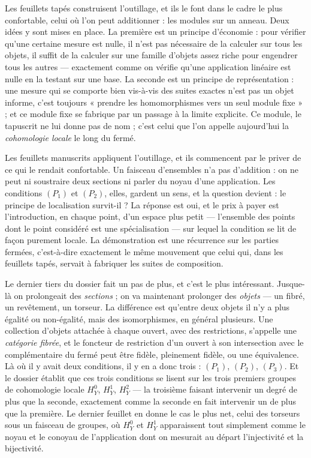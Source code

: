 \documentclass[11pt,a4paper]{article}
\begin{document}
\begin{resume}
Les feuillets tapés construisent l'outillage, et ils le font dans le cadre le
plus confortable, celui où l'on peut additionner : les modules sur un anneau.
Deux idées y sont mises en place. La première est un principe d'économie : pour
vérifier qu'une certaine mesure est nulle, il n'est pas nécessaire de la
calculer sur tous les objets, il suffit de la calculer sur une famille
d'objets assez riche pour engendrer tous les autres — exactement comme on
vérifie qu'une application linéaire est nulle en la testant sur une base. La
seconde est un principe de représentation : une mesure qui se comporte bien
vis-à-vis des suites exactes n'est pas un objet informe, c'est toujours
« prendre les homomorphismes vers un seul module fixe » ; et ce module fixe se
fabrique par un passage à la limite explicite. Ce module, le tapuscrit ne lui
donne pas de nom ; c'est celui que l'on appelle aujourd'hui la
\emph{cohomologie locale} le long du fermé.

Les feuillets manuscrits appliquent l'outillage, et ils commencent par le
priver de ce qui le rendait confortable. Un faisceau d'ensembles n'a pas
d'addition : on ne peut ni soustraire deux sections ni parler du noyau d'une
application. Les conditions $(P_1)$ et $(P_2)$, elles, gardent un sens, et la
question devient : le principe de localisation survit-il ? La réponse est oui,
et le prix à payer est l'introduction, en chaque point, d'un espace plus petit
— l'ensemble des points dont le point considéré est une spécialisation — sur
lequel la condition se lit de façon purement locale. La démonstration est une
récurrence sur les parties fermées, c'est-à-dire exactement le même mouvement
que celui qui, dans les feuillets tapés, servait à fabriquer les suites de
composition.

Le dernier tiers du dossier fait un pas de plus, et c'est le plus intéressant.
Jusque-là on prolongeait des \emph{sections} ; on va maintenant prolonger des
\emph{objets} — un fibré, un revêtement, un torseur. La différence est qu'entre
deux objets il n'y a plus égalité ou non-égalité, mais des isomorphismes, en
général plusieurs. Une collection d'objets attachée à chaque ouvert, avec des
restrictions, s'appelle une \emph{catégorie fibrée}, et le foncteur de
restriction d'un ouvert à son intersection avec le complémentaire du fermé peut
être fidèle, pleinement fidèle, ou une équivalence. Là où il y avait deux
conditions, il y en a donc trois : $(P_1)$, $(P_2)$, $(P_3)$. Et le dossier
établit que ces trois conditions se lisent sur les trois premiers groupes de
cohomologie locale $H^0_Y$, $H^1_Y$, $H^2_Y$ — la troisième faisant intervenir
un degré de plus que la seconde, exactement comme la seconde en fait intervenir
un de plus que la première. Le dernier feuillet en donne le cas le plus net,
celui des torseurs sous un faisceau de groupes, où $H^0_Y$ et $H^1_Y$
apparaissent tout simplement comme le noyau et le conoyau de l'application dont
on mesurait au départ l'injectivité et la bijectivité.


\end{resume}
\end{document}
